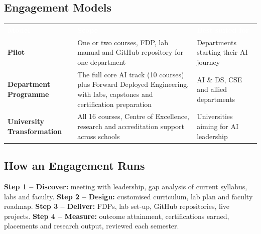 \documentclass[10pt,a4paper]{article}
\newcommand{\hdr}{\rowcolor{navy}}
\newcommand{\hw}[1]{\textcolor{white}{\bfseries #1}}
\begin{document}
\subsection*{Engagement Models}
\par{\small\begin{tabularx}{\linewidth}{@{}>{\bfseries}p{2.9cm}Y>{\raggedright\arraybackslash}p{4.2cm}@{}}\hdr\hw{Model}&\hw{Scope}&\hw{Best suited for}\\
Pilot & One or two courses, FDP, lab manual and GitHub repository for one department & Departments starting their AI journey\\
Department Programme & The full core AI track (10 courses) plus Forward Deployed Engineering, with labs, capstones and certification preparation & AI \& DS, CSE and allied departments\\
University Transformation & All 16 courses, Centre of Excellence, research and accreditation support across schools & Universities aiming for AI leadership\\\bottomrule\end{tabularx}}
\subsection*{How an Engagement Runs}
{\small{\color{saffront}\bfseries Step 1 -- Discover:} meeting with leadership, gap analysis of current syllabus, labs and faculty. {\color{chakra}\bfseries Step 2 -- Design:} customised curriculum, lab plan and faculty roadmap. {\color{igreent}\bfseries Step 3 -- Deliver:} FDPs, lab set-up, GitHub repositories, live projects. {\color{gold}\bfseries Step 4 -- Measure:} outcome attainment, certifications earned, placements and research output, reviewed each semester.}
\newpage
{\renewcommand{\contentsname}{Contents}\setcounter{tocdepth}{1}\small\tableofcontents}\newpage
\end{document}
